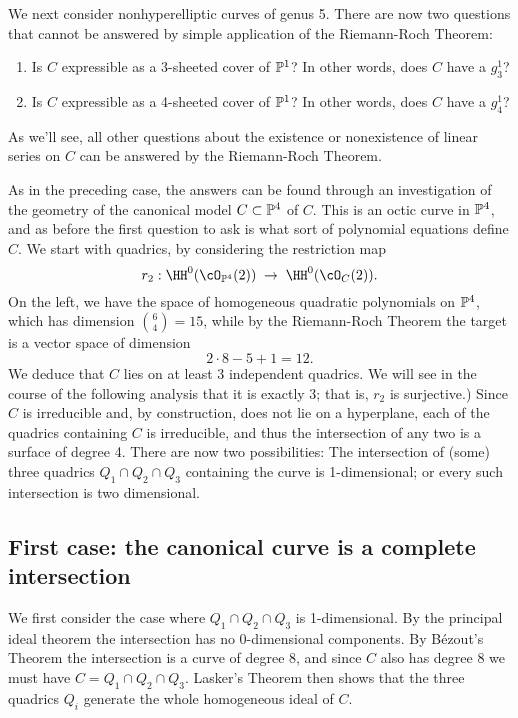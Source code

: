 We next consider  nonhyperelliptic curves of genus 5. There are now two questions that cannot be answered by simple application of the Riemann-Roch Theorem:

\begin{enumerate}
\item Is $C$ expressible as a 3-sheeted cover of $\PP^1$? In other words, does $C$ have a $g^1_3$?
\item Is $C$ expressible as a 4-sheeted cover of $\PP^1$? In other words, does $C$ have a $g^1_4$?
\end{enumerate}

As we'll see, all other questions about the existence or nonexistence of linear series on $C$ can be answered by the Riemann-Roch Theorem.

As in the preceding case, the answers can be found through an investigation of the geometry of the canonical model $C \subset \PP^4$ of $C$. This is an octic curve in $\PP^4$, and as before the first question to ask is what sort of polynomial equations define $C$. We start with quadrics, by considering the restriction map
$$
r_2 : \HH^0(\cO_{\PP^4}(2)) \; \to \; \HH^0(\cO_{C}(2)).
$$
On the left, we have the space of homogeneous quadratic polynomials on $\PP^4$, which has dimension $\binom{6}{4} = 15$, while by the Riemann-Roch Theorem the target is a vector space of dimension
$$
2\cdot8 - 5 + 1 = 12.
$$
We deduce that $C$ lies on at least 3 independent quadrics. We will see in the course of the following analysis that it is exactly 3; that is, $r_2$ is surjective.) Since $C$ is irreducible and, by construction, does not lie on a hyperplane, each of the quadrics containing $C$ is irreducible, and thus the intersection of any two is a surface of degree 4. There are now two possibilities:  The intersection of (some) three quadrics $Q_1 \cap Q_2 \cap Q_3$ containing the curve is 1-dimensional; or every such intersection is two dimensional. 

\subsection{First case: the canonical curve is a complete intersection}

We first consider the case where $Q_1 \cap Q_2 \cap Q_3$ is 1-dimensional. By the principal ideal theorem the intersection has no 0-dimensional components. By B\'ezout's Theorem the intersection is a curve of degree 8, and since $C$ also has degree 8 we must have $C=Q_1 \cap Q_2 \cap Q_3$. Lasker's Theorem then shows that the three quadrics $Q_i$ generate the whole homogeneous ideal of $C$.

